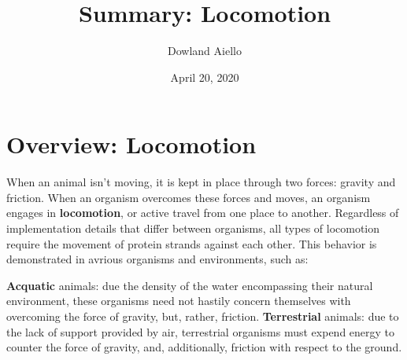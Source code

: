 \documentclass{article}
\begin{document}
\title{Summary: Locomotion}
\author{Dowland Aiello}
\date{April 20, 2020}

\maketitle
\tableofcontents
\fancyhf{}

\newpage

\section{Overview: Locomotion}

When an animal isn't moving, it is kept in place through two forces: gravity and
friction. When an organism overcomes these forces and moves, an organism
engages in \textbf{locomotion}, or active travel from one place to another.
Regardless of implementation details that differ between organisms, all types of
locomotion require the movement of protein strands against each other. This
behavior is demonstrated in avrious organisms and environments, such as:

\begin{itemize}
    \textbf{Acquatic} animals: due the density of the water encompassing their
    natural environment, these organisms need not hastily concern themselves with
    overcoming the force of gravity, but, rather, friction.
    \textbf{Terrestrial} animals: due to the lack of support provided by air,
    terrestrial organisms must expend energy to counter the force of gravity,
    and, additionally, friction with respect to the ground.
\end{itemize}
\end{document}
